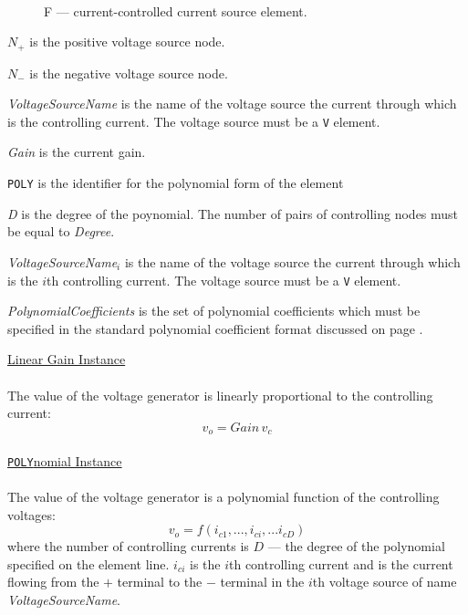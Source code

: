 
\begin{figure}[h]
\centering
\ 
\caption{F --- current-controlled current source element.}
\end{figure}


\begin{widelist}
\item[$N_{+}$] is the positive voltage source node.
\item[$N_{-}$] is the negative voltage source node.
\item[{\it VoltageSourceName}] is the name of the voltage source the current
through which is the controlling current.
The voltage source must be a {\tt V} element.
\item[{\it Gain}] is the current gain.
\item[{\tt POLY}] is the identifier for the polynomial form of the element
\item[{\it D}] is the degree of the poynomial. The number of pairs of
           controlling nodes must be equal to {\it Degree}.
\item[{\it VoltageSourceName$_i$}] is the name of the voltage source the current
through which is the $i$th controlling current.
The voltage source must be a {\tt V} element.
\item[{\it PolynomialCoefficients}] is the set of polynomial coefficients
which must be specified in the standard polynomial coefficient format
discussed on page \pageref{section:poly}.
\end{widelist}
\noindent\underline{Linear Gain Instance}
\\[0.1in]\hspace*{\fill}\\[0.1in]
The value of the voltage generator is linearly proportional to the controlling
current:
\begin{equation}
v_o = Gain\,v_c
\end{equation}
\\[0.2in]\noindent\underline{{\tt POLY}nomial Instance}
\\[0.1in]\hspace*{\fill}\\[0.1in]
The value of the voltage generator is a polynomial function of the controlling
voltages:
\begin{equation}
v_o = f(i_{c1}, ...,  i_{ci}, ...  i_{cD})
\end{equation}
where the number of controlling currents is $D$ --- the degree of the polynomial
specified on the element line.
$i_{ci}$ is the $i$th controlling current and is the current flowing from the
$+$ terminal to the $-$ terminal in the
$i$th voltage source of name {\it VoltageSourceName}.

